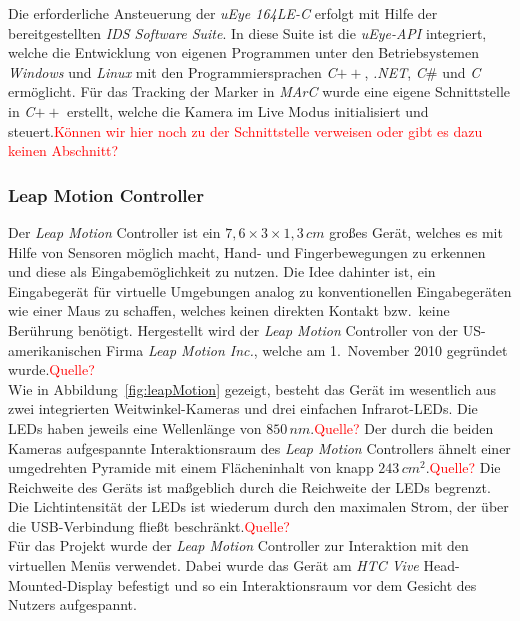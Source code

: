 Die erforderliche Ansteuerung der \textit{uEye 164LE-C} erfolgt mit Hilfe der bereitgestellten \textit{IDS Software Suite}. In diese Suite ist die \textit{uEye-API} integriert, welche die Entwicklung von eigenen Programmen unter den Betriebsystemen \textit{Windows} und \textit{Linux} mit den Programmiersprachen \textit{C}$++$, \textit{.NET}, \textit{C$\#$} und \textit{C} ermöglicht.\cite{website:IDSSuite} Für das Tracking der Marker in \textit{MArC} wurde eine eigene Schnittstelle in \textit{C}$++$ erstellt, welche die Kamera im Live Modus initialisiert und steuert.\textcolor{red}{Können wir hier noch zu der Schnittstelle verweisen oder gibt es dazu keinen Abschnitt?}

\subsubsection{Leap Motion Controller}\label{sec:LeapMotion} 	
Der \textit{Leap Motion} Controller \cite{website:LeapMotion} ist ein $7,6\times3\times1,3\,cm$ großes Gerät, welches es mit Hilfe von Sensoren möglich macht, Hand- und Fingerbewegungen zu erkennen und diese als Eingabemöglichkeit zu nutzen. Die Idee dahinter ist, ein Eingabegerät für virtuelle Umgebungen analog zu konventionellen Eingabegeräten wie einer Maus zu schaffen, welches keinen direkten Kontakt bzw.\ keine Berührung benötigt. Hergestellt wird der \textit{Leap Motion} Controller von der US-amerikanischen Firma \emph{Leap Motion Inc.}, welche am 1.\ November 2010 gegründet wurde.\textcolor{red}{Quelle?}\\
Wie in Abbildung~\ref{fig:leapMotion} gezeigt, besteht das Gerät im wesentlich aus zwei integrierten Weitwinkel-Kameras und drei einfachen Infrarot-LEDs. Die LEDs haben jeweils eine Wellenlänge von $850\,nm$.\textcolor{red}{Quelle?} Der durch die beiden Kameras aufgespannte Interaktionsraum des \textit{Leap Motion} Controllers ähnelt einer umgedrehten Pyramide mit einem Flächeninhalt von knapp $243\,cm{^2}$.\textcolor{red}{Quelle?} Die Reichweite des Geräts ist maßgeblich durch die Reichweite der LEDs begrenzt. Die Lichtintensität der LEDs ist wiederum durch den maximalen Strom, der über die USB-Verbindung fließt beschränkt.\textcolor{red}{Quelle?}\\
Für das Projekt wurde der \textit{Leap Motion} Controller zur Interaktion mit den virtuellen Menüs verwendet. Dabei wurde das Gerät am \textit{HTC Vive} Head-Mounted-Display befestigt und so ein Interaktionsraum vor dem Gesicht des Nutzers aufgespannt.

